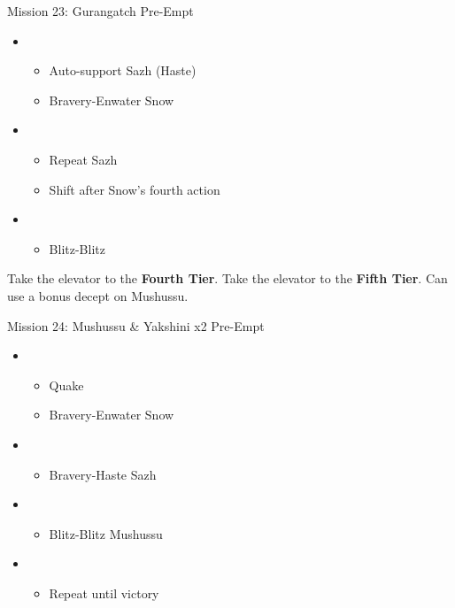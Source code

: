 	\begin{battle}[0:22]{Mission 23: Gurangatch Pre-Empt}
		\begin{itemize}
			\item \first
			      \begin{itemize}
				      \item Auto-support Sazh (Haste)
				      \item Bravery-Enwater Snow
			      \end{itemize}
			\item \fifth
			      \begin{itemize}
				      \item Repeat Sazh
				      \item Shift after Snow's fourth action
			      \end{itemize}
			\item \sixth
			      \begin{itemize}
				      \item Blitz-Blitz
			      \end{itemize}
		\end{itemize}
	\end{battle}

	Take the elevator to the \textbf{Fourth Tier}.
	Take the elevator to the \textbf{Fifth Tier}.
	Can use a bonus decept on Mushussu.
	\begin{battle}[0:28]{Mission 24: Mushussu \& Yakshini x2 Pre-Empt}
		\begin{itemize}
			\item \first
			      \begin{itemize}
				      \item Quake
				      \item Bravery-Enwater Snow
			      \end{itemize}
			\item \fifth
			      \begin{itemize}
				      \item Bravery-Haste Sazh
			      \end{itemize}
			\item \fourth
			      \begin{itemize}
				      \item Blitz-Blitz Mushussu
			      \end{itemize}
			\item \sixth
			      \begin{itemize}
				      \item Repeat until victory
			      \end{itemize}
		\end{itemize}
	\end{battle}

